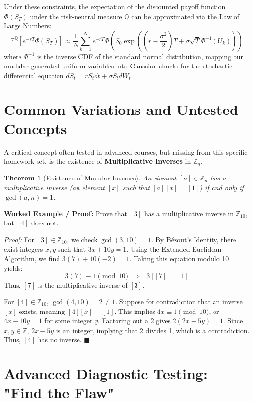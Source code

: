 \documentclass[11pt, a4paper]{article}
\newtheorem{theorem}{Theorem}[section]
\theoremstyle{definition}
\theoremstyle{remark}
\newcommand{\Z}{\mathbb{Z}}
\newcommand{\E}{\mathbb{E}}
\begin{document}
Under these constraints, the expectation of the discounted payoff function $\Phi(S_T)$ under the risk-neutral measure $\mathbb{Q}$ can be approximated via the Law of Large Numbers:
\[
\E^{\mathbb{Q}}[e^{-rT} \Phi(S_T)] \approx \frac{1}{N} \sum_{k=1}^{N} e^{-rT} \Phi\left( S_0 \exp\left( \left(r - \frac{\sigma^2}{2}\right)T + \sigma \sqrt{T} \Phi^{-1}(U_k) \right) \right)
\]
where $\Phi^{-1}$ is the inverse CDF of the standard normal distribution, mapping our modular-generated uniform variables into Gaussian shocks for the stochastic differential equation $dS_t = r S_t dt + \sigma S_t dW_t$.

\newpage
\section{Common Variations and Untested Concepts}

A critical concept often tested in advanced courses, but missing from this specific homework set, is the existence of \textbf{Multiplicative Inverses} in $\Z_n$. 

\begin{theorem}[Existence of Modular Inverses]
An element $[a] \in \Z_n$ has a multiplicative inverse (an element $[x]$ such that $[a][x] = [1]$) if and only if $\gcd(a, n) = 1$.
\end{theorem}

\textbf{Worked Example / Proof:}
Prove that $[3]$ has a multiplicative inverse in $\Z_{10}$, but $[4]$ does not.

\textit{Proof:} 
For $[3] \in \Z_{10}$, we check $\gcd(3, 10) = 1$. By Bézout's Identity, there exist integers $x, y$ such that $3x + 10y = 1$. Using the Extended Euclidean Algorithm, we find $3(7) + 10(-2) = 1$. 
Taking this equation modulo 10 yields:
\[
3(7) \equiv 1 \pmod{10} \implies [3][7] = [1]
\]
Thus, $[7]$ is the multiplicative inverse of $[3]$.

For $[4] \in \Z_{10}$, $\gcd(4, 10) = 2 \neq 1$. Suppose for contradiction that an inverse $[x]$ exists, meaning $[4][x] = [1]$. This implies $4x \equiv 1 \pmod{10}$, or $4x - 10y = 1$ for some integer $y$. Factoring out a 2 gives $2(2x - 5y) = 1$. Since $x, y \in \Z$, $2x - 5y$ is an integer, implying that 2 divides 1, which is a contradiction. Thus, $[4]$ has no inverse.
\hfill $\blacksquare$

\section{Advanced Diagnostic Testing: "Find the Flaw"}
\end{document}
